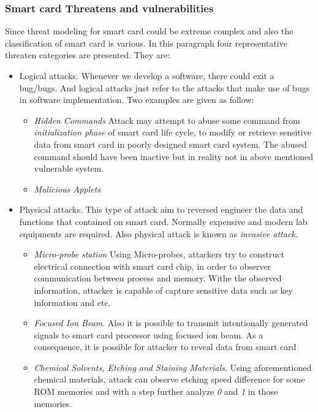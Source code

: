 \subsubsection{Smart card Threatens and vulnerabilities}
Since threat modeling for smart card could be extreme complex and also the classification of smart card is various. In this paragraph four representative threaten categories are presented. They are\cite{smart_card_attack2}:
\begin{itemize}
\item Logical attacks. Whenever we develop a software, there could exit a bug/bugs. And logical attacks just refer to the attacks that make use of bugs in software implementation\cite{smart_card_attack2}. Two examples are given as follow:
\begin{itemize}
\item \emph{Hidden Commands} Attack may attempt to abuse some command from \emph{initialization phase} of smart card life cycle, to modify or retrieve sensitive data from smart card in poorly designed smart card system. The abused command should have been inactive but in reality not in above mentioned vulnerable system\cite{smart_card_attack2}.
\item \emph{Malicious Applets}
\end{itemize}
\item Physical attacks. This type of attack aim to reversed engineer the data and functions that contained on smart card. Normally expensive and modern lab equipments are required\cite{smart_card_attack2}. Also physical attack is known as \emph{invasive attack}\cite{smart_card_attack3}.
\begin{itemize} 
\item \emph{Micro-probe station} Using Micro-probes, attackers try to construct electrical connection with smart card chip, in order to observer communication between process and memory. Withe the observed information, attacker is capable of capture sensitive data such as key information and etc\cite{smart_card_attack3}.
\item \emph{Focused Ion Beam}. Also it is possible to transmit intentionally generated signals to smart card processor using focused ion beam. As a consequence, it is possible for attacker to reveal data from smart card\cite{smart_card_attack3}
\item \emph{Chemical Solvents, Etching and Staining Materials}. Using aforementioned chemical materials, attack can observe etching speed difference for some ROM memories  and with a step further analyze \emph{0} and \emph{1} in those memories\cite{smart_card_attack2}.

\end{itemize}
\end{itemize}
